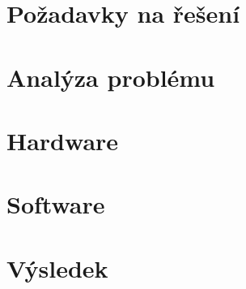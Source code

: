 \chapter{Požadavky na řešení}

\chapter{Analýza problému}

\chapter{Hardware}

\chapter{Software}

\chapter{Výsledek}
